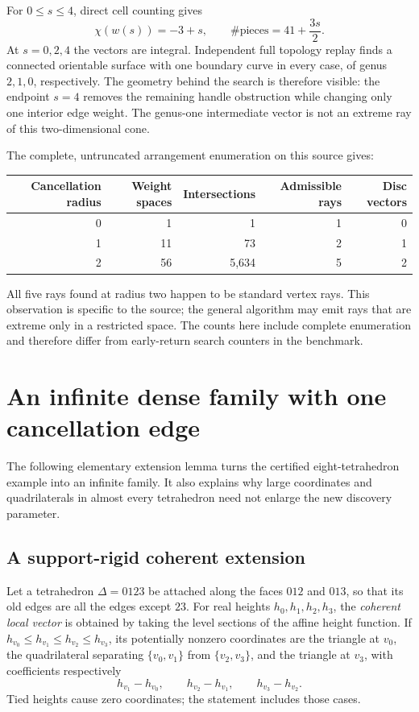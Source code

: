 For $0\le s\le4$, direct cell counting gives
\[
                   \chi(w(s))=-3+s,\qquad
                   \#\text{pieces}=41+\frac{3s}{2}.
\]
At $s=0,2,4$ the vectors are integral. Independent full topology replay
finds a connected orientable surface with one boundary curve in every
case, of genus $2,1,0$, respectively. The geometry behind the search is
therefore visible: the endpoint $s=4$ removes the remaining handle
obstruction while changing only one interior edge weight. The genus-one
intermediate vector is not an extreme ray of this two-dimensional cone.

The complete, untruncated arrangement enumeration on this source gives:
\begin{center}
\begin{tabular}{@{}r r r r r@{}}
\toprule
Cancellation radius & Weight spaces & Intersections & Admissible rays & Disc vectors\\
\midrule
0 & 1 & 1 & 1 & 0\\
1 & 11 & 73 & 2 & 1\\
2 & 56 & 5,634 & 5 & 2\\
\bottomrule
\end{tabular}
\end{center}
All five rays found at radius two happen to be standard vertex rays.
This observation is specific to the source; the general algorithm may
emit rays that are extreme only in a restricted space. The counts here
include complete enumeration and therefore differ from early-return
search counters in the benchmark.

\section{An infinite dense family with one cancellation edge}
\label{sec:layering}

The following elementary extension lemma turns the certified eight-tetrahedron
example into an infinite family.  It also explains why large coordinates
and quadrilaterals in almost every tetrahedron need not enlarge the new
discovery parameter.

\subsection{A support-rigid coherent extension}

Let a tetrahedron $\Delta=0123$ be attached along the faces $012$ and
$013$, so that its old edges are all the edges except $23$.  For real
heights $h_0,h_1,h_2,h_3$, the \emph{coherent local vector} is obtained
by taking the level sections of the affine height function.  If
$h_{v_0}\leq h_{v_1}\leq h_{v_2}\leq h_{v_3}$, its potentially nonzero
coordinates are the triangle at $v_0$, the quadrilateral separating
$\{v_0,v_1\}$ from $\{v_2,v_3\}$, and the triangle at $v_3$, with
coefficients respectively
\[
 h_{v_1}-h_{v_0},\qquad h_{v_2}-h_{v_1},\qquad
 h_{v_3}-h_{v_2}.
\]
Tied heights cause zero coordinates; the statement includes those cases.

